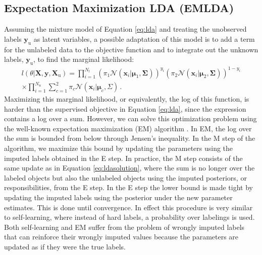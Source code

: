 \documentclass[twoside]{memoir}\usepackage[]{graphicx}\usepackage{xcolor}
\renewcommand{\cite}{\citep}
\begin{document}
\subsection{Expectation Maximization LDA (EMLDA)}
Assuming the mixture model of Equation \eqref{eq:lda} and treating the unobserved labels $\mathbf{y}_\textrm{u}$ as latent variables, a possible adaptation of this model is to add a term for the unlabeled data to the objective function and to integrate out the unknown labels, $\mathbf{y}_\textrm{u}$, to find the marginal likelihood:
\begin{align}
l(\theta|\mathbf{X},\mathbf{y},\mathbf{X}_\textrm{u})=\prod_{i=1}^{N_l}\left(\pi_1 \mathcal{N}(\mathbf{x}_i|\boldsymbol{\mu}_1,\mathbf{\Sigma})\right)^{y_i} \left(\pi_2 \mathcal{N}(\mathbf{x}_i|\boldsymbol{\mu}_2,\mathbf{\Sigma})\right)^{1-y_i}  \nonumber \\ 
\times \prod_{i=1}^{N_u} \sum_{c=1}^2 \pi_c \mathcal{N}(\mathbf{x}_i|\boldsymbol{\mu}_c,\Sigma) \,.
\end{align}
Maximizing this marginal likelihood, or equivalently, the log of this function, is harder than the supervised objective in Equation \eqref{eq:lda}, since the expression contains a log over a sum. However, we can solve this optimization problem using the well-known expectation maximization (EM) algorithm \cite{Dempster1977, Nigam2000}. In EM, the log over the sum is bounded from below through Jensen's inequality. In the M step of the algorithm, we maximize this bound by updating the parameters using the imputed labels obtained in the E step. In practice, the M step consists of the same update as in Equation \eqref{eq:ldasolution}, where the sum is no longer over the labeled objects but also the unlabeled objects using the imputed posteriors, or responsibilities, from the E step. In the E step the lower bound is made tight by updating the imputed labels using the posterior under the new parameter estimates. This is done until convergence. 
In effect this procedure is very similar to self-learning, where instead of hard labels, a probability over labelings is used. Both self-learning and EM suffer from the problem of wrongly imputed labels that can reinforce their wrongly imputed values because the parameters are updated as if they were the true labels.
\end{document}
